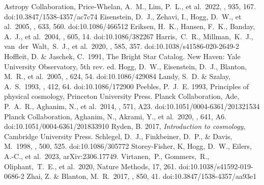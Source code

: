 \documentclass[modern]{aastex631}
\begin{document}
\begin{thebibliography}{dummy}
 Astropy Collaboration, Price-Whelan, A.~M., Lim, P.~L., et al.\ 2022, \apj, 935, 167. doi:10.3847/1538-4357/ac7c74
 Eisenstein, D.~J., Zehavi, I., Hogg, D.~W., et al.\ 2005, \apj, 633, 560. doi:10.1086/466512
 Eriksen, H.~K., Hansen, F.~K., Banday, A.~J., et al.\ 2004, \apj, 605, 14. doi:10.1086/382267
 Harris,~C.~R., Millman,~K.~J., van~der~Walt,~S.~J., et al.\ 2020, \nat, 585, 357. doi:10.1038/s41586-020-2649-2
Hoffleit, D. \& Jaschek, C.\ 1991, The Bright Star Catalog. New Haven: Yale University Observatory, 5th rev. ed.
 Hogg, D.~W., Eisenstein, D.~J., Blanton, M.~R., et al.\ 2005, \apj, 624, 54. doi:10.1086/429084
 Landy, S.~D. \& Szalay, A.~S.\ 1993, \apj, 412, 64. doi:10.1086/172900
 Peebles, P.~J.~E. 1993, Principles of physical cosmology, Princeton University Press.
 Planck Collaboration, Ade, P.~A.~R., Aghanim, N., et al.\ 2014, \aap, 571, A23. doi:10.1051/0004-6361/201321534
 Planck Collaboration, Aghanim, N., Akrami, Y., et al.\ 2020, \aap, 641, A6. doi:10.1051/0004-6361/201833910
 Ryden, B. 2017, \textit{Introduction to cosmology}, Cambridge University Press.
 Schlegel, D.~J., Finkbeiner, D.~P., \& Davis, M.\ 1998, \apj, 500, 525. doi:10.1086/305772
 Storey-Fisher, K, Hogg, D.~W., Eilers, A.-C., et al.\ 2023, arXiv:2306.17749.
 Virtanen,~P., Gommers,~R., Oliphant,~T.~E., et al.\ 2020, Nature Methods, 17, 261. doi:10.1038/s41592-019-0686-2
 Zhai, Z. \& Blanton, M.~R.\ 2017, \apj, 850, 41. doi:10.3847/1538-4357/aa93e1
\end{thebibliography}
\end{document}
